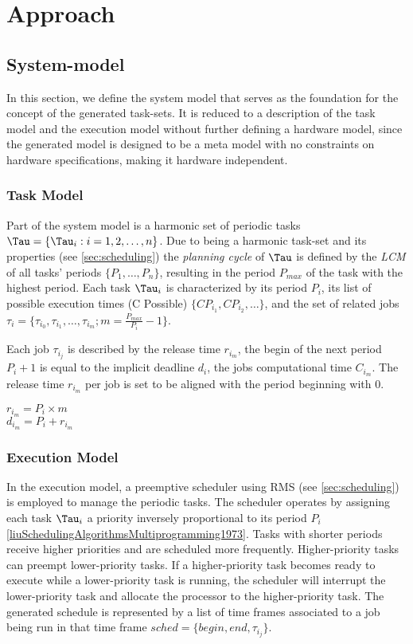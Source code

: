 \chapter{Approach}
\section{System-model}\label{sec:model}
In this section, we define the system model that serves as the foundation for the concept of the generated task-sets.
It is reduced to a description of the task model and the execution model without further defining a hardware model, since the generated model is designed to be a meta model with no constraints on hardware specifications, making it hardware independent.

\subsection{Task Model}\label{sec:task_model}
Part of the system model is a harmonic set of periodic tasks $\Tau=\{\Tau_i: i = 1, 2, \ldots, n\}$.
Due to being a harmonic task-set and its properties (see \cref{sec:scheduling}) the \textit{planning cycle}\cite{dar-tzenpengAssignmentSchedulingCommunicating1997} of $\Tau$ is defined by the \textit{\ac{LCM}} of all tasks' periods $\{P_1, \ldots, P_n\}$, resulting in the period $P_{max}$ of the task with the highest period.
Each task $\Tau_i$ is characterized by its period $P_i$, its list of possible execution times (C Possible) $\{CP_{i_1}, CP_{i_2}, \ldots\}$, and the set of related jobs $\tau_i=\{\tau_{i_0}, \tau_{i_1}, \dots, \tau_{i_m}; m = \frac{P_{max}}{P_i} - 1\}$.

Each job $\tau_{i_j}$ is described by the release time $r_{i_m}$, the begin of the next period $P_i+1$ is equal to the implicit deadline $d_i$, the jobs computational time $C_{i_m}$.
The release time $r_{i_m}$ per job is set to be aligned with the period beginning with $0$.
\begin{center}
	$r_{i_m} = P_i \times m$ \\
	$d_{i_m} = P_i + r_{i_m}$
\end{center}

\subsection{Execution Model}\label{sec:execution_model}
In the execution model, a preemptive scheduler using \ac{RMS} (see \cref{sec:scheduling}) is employed to manage the periodic tasks. 
The scheduler operates by assigning each task $\Tau_i$ a priority inversely proportional to its period $P_i$ \ref{liuSchedulingAlgorithmsMultiprogramming1973}.
Tasks with shorter periods receive higher priorities and are scheduled more frequently.
Higher-priority tasks can preempt lower-priority tasks.
If a higher-priority task becomes ready to execute while a lower-priority task is running, the scheduler will interrupt the lower-priority task and allocate the processor to the higher-priority task.
The generated schedule is represented by a list of time frames associated to a job being run in that time frame $sched = \{begin, end, \tau_{i_j}\}$.

